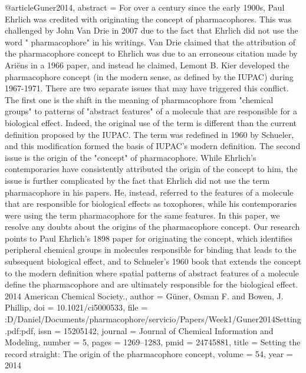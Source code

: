 @article{Guner2014,
abstract = {For over a century since the early 1900s, Paul Ehrlich was credited with originating the concept of pharmacophores. This was challenged by John Van Drie in 2007 due to the fact that Ehrlich did not use the word " pharmacophore" in his writings. Van Drie claimed that the attribution of the pharmacophore concept to Ehrlich was due to an erroneous citation made by Ari{\"{e}}ns in a 1966 paper, and instead he claimed, Lemont B. Kier developed the pharmacophore concept (in the modern sense, as defined by the IUPAC) during 1967-1971. There are two separate issues that may have triggered this conflict. The first one is the shift in the meaning of pharmacophore from "chemical groups" to patterns of "abstract features" of a molecule that are responsible for a biological effect. Indeed, the original use of the term is different than the current definition proposed by the IUPAC. The term was redefined in 1960 by Schueler, and this modification formed the basis of IUPAC's modern definition. The second issue is the origin of the "concept" of pharmacophore. While Ehrlich's contemporaries have consistently attributed the origin of the concept to him, the issue is further complicated by the fact that Ehrlich did not use the term pharmacophore in his papers. He, instead, referred to the features of a molecule that are responsible for biological effects as toxophores, while his contemporaries were using the term pharmacophore for the same features. In this paper, we resolve any doubts about the origins of the pharmacophore concept. Our research points to Paul Ehrlich's 1898 paper for originating the concept, which identifies peripheral chemical groups in molecules responsible for binding that leads to the subsequent biological effect, and to Schueler's 1960 book that extends the concept to the modern definition where spatial patterns of abstract features of a molecule define the pharmacophore and are ultimately responsible for the biological effect. {\textcopyright} 2014 American Chemical Society.},
author = {G{\"{u}}ner, Osman F. and Bowen, J. Phillip},
doi = {10.1021/ci5000533},
file = {:D\:/Daniel/Documents/pharmacophore/servicio/Papers/Week1/Guner2014Setting.pdf:pdf},
issn = {15205142},
journal = {Journal of Chemical Information and Modeling},
number = {5},
pages = {1269--1283},
pmid = {24745881},
title = {{Setting the record straight: The origin of the pharmacophore concept}},
volume = {54},
year = {2014}
}
